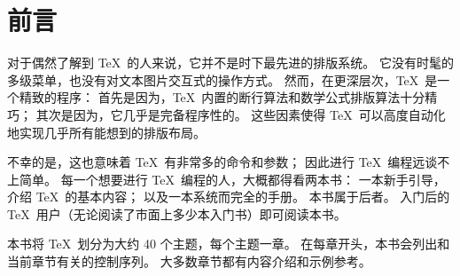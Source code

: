 \documentclass[letterpaper]{book}
\begin{document}
\chapter*{前言}

对于偶然了解到 \TeX\ 的人来说，它并不是时下最先进的排版系统。
它没有时髦的多级菜单，也没有对文本图片交互式的操作方式。
然而，在更深层次，\TeX\ 是一个精致的程序：
首先是因为，\TeX\ 内置的断行算法和数学公式排版算法十分精巧；
其次是因为，它几乎是完备程序性的。
这些因素使得 \TeX\ 可以高度自动化地实现几乎所有能想到的排版布局。

不幸的是，这也意味着 \TeX\ 有非常多的命令和参数；
因此进行 \TeX\ 编程远谈不上简单。
每一个想要进行 \TeX\ 编程的人，大概都得看两本书：
一本新手引导，介绍 \TeX\ 的基本内容；
以及一本系统而完全的手册。
本书属于后者。
入门后的 \TeX\ 用户（无论阅读了市面上多少本入门书）即可阅读本书。

本书将 \TeX\ 划分为大约 40 个主题，每个主题一章。
在每章开头，本书会列出和当前章节有关的控制序列。
大多数章节都有内容介绍和示例参考。
\end{document}

